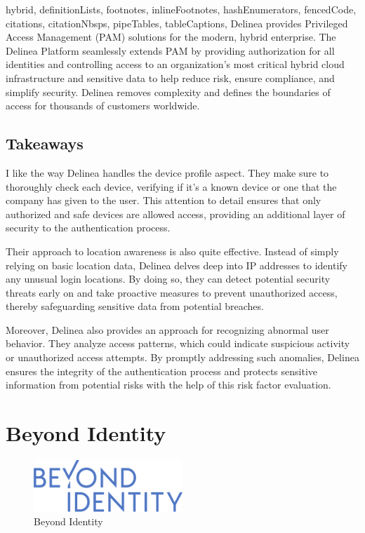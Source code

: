 \documentclass[
  digital,     %
  oneside,     %
  nosansbold,  %
  nocolorbold, %
  lof,         %
  lot,         %
]{fithesis4}
\begin{document}
\begin{markdown*}{%
  hybrid,
  definitionLists,
  footnotes,
  inlineFootnotes,
  hashEnumerators,
  fencedCode,
  citations,
  citationNbsps,
  pipeTables,
  tableCaptions,
}
Delinea provides Privileged Access Management (PAM) solutions for the modern, hybrid enterprise.
The Delinea Platform seamlessly extends PAM by providing authorization for all identities and controlling access to an organization’s most critical hybrid cloud infrastructure and sensitive data to help reduce risk, ensure compliance, and simplify security.
Delinea removes complexity and defines the boundaries of access for thousands of customers worldwide.

\subsection{Takeaways}
I like the way Delinea handles the device profile aspect.
They make sure to thoroughly check each device, verifying if it's a known device or one that the company has given to the user. This attention to detail ensures that only authorized and safe devices are allowed access, providing an additional layer of security to the authentication process.

Their approach to location awareness is also quite effective.
Instead of simply relying on basic location data, Delinea delves deep into IP addresses to identify any unusual login locations. By doing so, they can detect potential security threats early on and take proactive measures to prevent unauthorized access, thereby safeguarding sensitive data from potential breaches.

Moreover, Delinea also provides an approach for recognizing abnormal user behavior.
They analyze access patterns, which could indicate suspicious activity or unauthorized access attempts.
By promptly addressing such anomalies, Delinea ensures the integrity of the authentication process and protects sensitive information from potential risks with the help of this risk factor evaluation. \cite{existing-delinea}


\section{Beyond Identity}

\begin{figure}[htbp]
  \centering
  \includegraphics[width=0.5\textwidth]{img/BeyondIdentity-logo.png}
  \caption{Beyond Identity}
  \label{fig:beyond-identity-logo}
\end{figure}


\end{markdown*}
\end{document}
